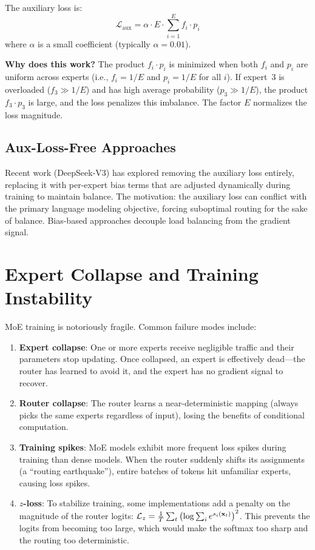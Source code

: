 The auxiliary loss is:
\begin{equation}
\label{eq:13:aux_loss}
\mathcal{L}_{\text{aux}} = \alpha \cdot E \cdot \sum_{i=1}^{E} f_i \cdot p_i
\end{equation}
where $\alpha$ is a small coefficient (typically $\alpha = 0.01$).

\textbf{Why does this work?} The product $f_i \cdot p_i$ is minimized when both $f_i$ and $p_i$ are uniform across experts (i.e., $f_i = 1/E$ and $p_i = 1/E$ for all $i$). If expert~3 is overloaded ($f_3 \gg 1/E$) and has high average probability ($p_3 \gg 1/E$), the product $f_3 \cdot p_3$ is large, and the loss penalizes this imbalance. The factor $E$ normalizes the loss magnitude.

\subsection{Aux-Loss-Free Approaches}

Recent work (DeepSeek-V3) has explored removing the auxiliary loss entirely, replacing it with per-expert bias terms that are adjusted dynamically during training to maintain balance. The motivation: the auxiliary loss can conflict with the primary language modeling objective, forcing suboptimal routing for the sake of balance. Bias-based approaches decouple load balancing from the gradient signal.

\section{Expert Collapse and Training Instability}
\label{ch:13:sec:collapse}

MoE training is notoriously fragile. Common failure modes include:

\begin{enumerate}
  \item \textbf{Expert collapse}: One or more experts receive negligible traffic and their parameters stop updating. Once collapsed, an expert is effectively dead---the router has learned to avoid it, and the expert has no gradient signal to recover.
  
  \item \textbf{Router collapse}: The router learns a near-deterministic mapping (always picks the same experts regardless of input), losing the benefits of conditional computation.
  
  \item \textbf{Training spikes}: MoE models exhibit more frequent loss spikes during training than dense models. When the router suddenly shifts its assignments (a ``routing earthquake''), entire batches of tokens hit unfamiliar experts, causing loss spikes.
  
  \item \textbf{$z$-loss}: To stabilize training, some implementations add a penalty on the magnitude of the router logits: $\mathcal{L}_z = \frac{1}{T}\sum_t \left(\log \sum_i e^{s_i(\mathbf{x}_t)}\right)^2$. This prevents the logits from becoming too large, which would make the softmax too sharp and the routing too deterministic.
\end{enumerate}

